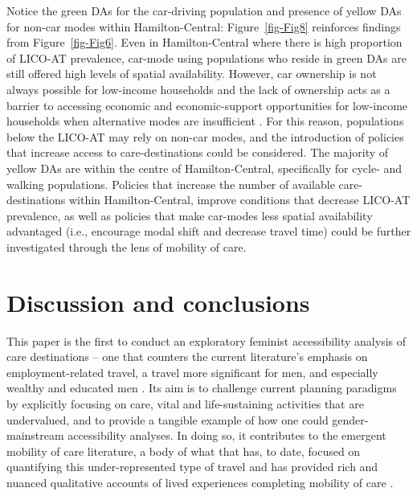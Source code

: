 \documentclass[
  authoryear,
  preprint,
  3p]{elsarticle}
\begin{document}
Notice the green DAs for the car-driving population and presence of
yellow DAs for non-car modes within Hamilton-Central:
Figure~\ref{fig-Fig8} reinforces findings from Figure~\ref{fig-Fig6}.
Even in Hamilton-Central where there is high proportion of LICO-AT
prevalence, car-mode using populations who reside in green DAs are still
offered high levels of spatial availability. However, car ownership is
not always possible for low-income households and the lack of ownership
acts as a barrier to accessing economic and economic-support
opportunities for low-income households \citep{morrisDoesLackingCar2020}
when alternative modes are insufficient
\citep{kleinTransitionsOutCar2023}. For this reason, populations below
the LICO-AT may rely on non-car modes, and the introduction of policies
that increase access to care-destinations could be considered. The
majority of yellow DAs are within the centre of Hamilton-Central,
specifically for cycle- and walking populations. Policies that increase
the number of available care-destinations within Hamilton-Central,
improve conditions that decrease LICO-AT prevalence, as well as policies
that make car-modes less spatial availability advantaged (i.e.,
encourage modal shift and decrease travel time) could be further
investigated through the lens of mobility of care.

\hypertarget{discussion-and-conclusions}{%
\section{Discussion and conclusions}\label{discussion-and-conclusions}}

This paper is the first to conduct an exploratory feminist accessibility
analysis of care destinations -- one that counters the current
literature's emphasis on employment-related travel, a travel more
significant for men, and especially wealthy and educated men
\citep{lawWomenTransportNew1999, hansonGenderMobilityNew2010}. Its aim
is to challenge current planning paradigms by explicitly focusing on
care, vital and life-sustaining activities that are undervalued, and to
provide a tangible example of how one could gender-mainstream
accessibility analyses. In doing so, it contributes to the emergent
mobility of care literature, a body of what that has, to date, focused
on quantifying this under-represented type of travel
\citep{gomezvaroAccountingCareEveryday2023, murillomunarCaregiversMoveGender2023, ravensbergenExploratoryAnalysisMobility2022, sanchezdemadariagaMobilityCareIntroducing2013, sanchezdemadariagaMeasuringMobilitiesCare2019, shumanCanMobilityCare2023}
and has provided rich and nuanced qualitative accounts of lived
experiences completing mobility of care
\citep{orjuelaReconsideringMobilityCare2023, ravensbergenVelomobilitiesCareLowcycling2020, sersliRidingAloneTogether2020}.
\end{document}
